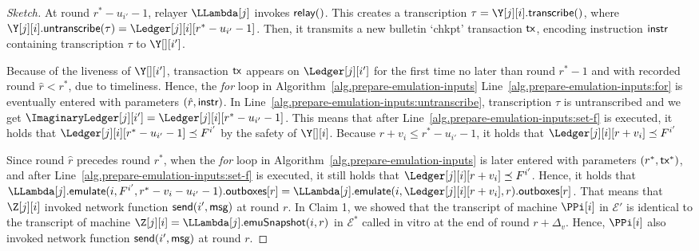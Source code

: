\begin{proof}[Sketch]
  At round $r^* - u_{i'} - 1$, relayer $\LLambda[j]$ invokes $\textsf{relay}()$.
  This creates a transcription $\tau = \Y[j][i].\transcribe()$, where
  $\Y[j][i].\untranscribe(\tau) = \Ledger[j][i][r^* - u_{i'} - 1]$.
  Then, it transmits a new bulletin `chkpt' transaction $\textsf{tx}$,
  encoding instruction $\textsf{instr}$ containing transcription $\tau$ to $\Y[][i']$.

  Because of the liveness of $\Y[][i']$, transaction $\textsf{tx}$ appears on $\Ledger[j][i']$ for the
  first time no later than round $r^* - 1$ and with recorded round $\hat{r} < r^*$, due to timeliness.
  Hence, the \emph{for} loop in Algorithm~\ref{alg.prepare-emulation-inputs}
  Line~\ref{alg.prepare-emulation-inputs:for} is eventually entered with
  parameters $(\hat{r}, \textsf{instr})$.
  In Line~\ref{alg.prepare-emulation-inputs:untranscribe}, transcription $\tau$
  is untranscribed and we get $\ImaginaryLedger[j][i'] = \Ledger[j][i][r^* - u_{i'} - 1]$.
  This means that after Line~\ref{alg.prepare-emulation-inputs:set-f} is executed,
  it holds that $\Ledger[j][i][r^* - u_{i'} - 1] \preceq F^{i'}$ by the safety of $\Y[][i]$.
  Because $r + v_i \leq r^* - u_{i'} - 1$, it holds that $\Ledger[j][i][r + v_i] \preceq F^{i'}$

  Since round $\hat{r}$ precedes round $r^*$, when the \emph{for} loop in Algorithm~\ref{alg.prepare-emulation-inputs}
  is later entered with parameters $(r^*, \textsf{tx}^*)$, and after Line~\ref{alg.prepare-emulation-inputs:set-f} is executed,
  it still holds that $\Ledger[j][i][r + v_i] \preceq F^{i'}$.
  Hence, it holds that
  $\LLambda[j].\emulate(i, F^{i'}, r^* - v_i - u_{i'} - 1).\outboxes[r] = \LLambda[j].\emulate(i, \Ledger[j][i][r + v_i], r).\outboxes[r]$.
  That means that $\Z[j][i]$ invoked network function $\textsf{send}(i', \textsf{msg})$ at round $r$.
  In Claim 1, we showed that the transcript of machine $\PPi[i]$ in $\mathcal{E}'$
  is identical to the transcript of machine $\Z[j][i] = \LLambda[j].\emulationSnapshot(i,r)$ in $\mathcal{E}^*$
  called in vitro at the end of round $r + \Delta_v$.
  Hence, $\PPi[i]$ also invoked network function $\textsf{send}(i', \textsf{msg})$ at round $r$.



\end{proof}

